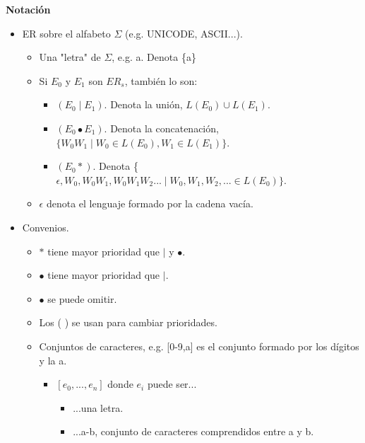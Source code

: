 \documentclass[\main/Apuntes_PL.tex]{subfiles}
\begin{document}
      \newpage
      \par
      \textbf{\large Notación}
      \begin{itemize}
        \item ER sobre el alfabeto $\Sigma$ (e.g. UNICODE, ASCII...).
              \begin{itemize}
                \item Una "letra" de $\Sigma$, e.g. a. Denota \{a\}
                \item Si $E_0$ y $E_1$ son $ER_s$, también lo son:
                      \begin{itemize}
                        \item $(E_0 \mid E_1)$. Denota la unión, $L(E_0) \cup L(E_1).$
                        \item $(E_0 \bullet E_1)$. Denota la concatenación, $ \{W_0 W_1 \mid W_0 \in  L(E_0), W_1 \in L(E_1)\}$.
                        \item $(E_0 \ast)$. Denota \{$\epsilon, W_0, W_0 W_1, W_0 W_1 W_2 ...\mid W_0, W_1, W_2, ... \in L(E_0)\}$.
                      \end{itemize}
                \item $\epsilon$ denota el lenguaje formado por la cadena vacía.
              \end{itemize}
        \item Convenios.
              \begin{itemize}
                \item $\ast$ tiene mayor prioridad que $\mid$ y $\bullet$.
                \item $\bullet$ tiene mayor prioridad que $\mid$.
                \item $\bullet$ se puede omitir.
                \item Los ( ) se usan para cambiar prioridades.
                \item Conjuntos de caracteres, e.g. [0-9,a] es el conjunto formado por los dígitos y la a.
                      \begin{itemize}
                        \item $[e_0, ..., e_n]$ donde $e_i$ puede ser...
                              \begin{itemize}
                                \item ...una letra.
                                \item ...a-b, conjunto de caracteres comprendidos entre a y b.
                              \end{itemize}

\end{itemize}
\end{itemize}
\end{itemize}
\end{document}
